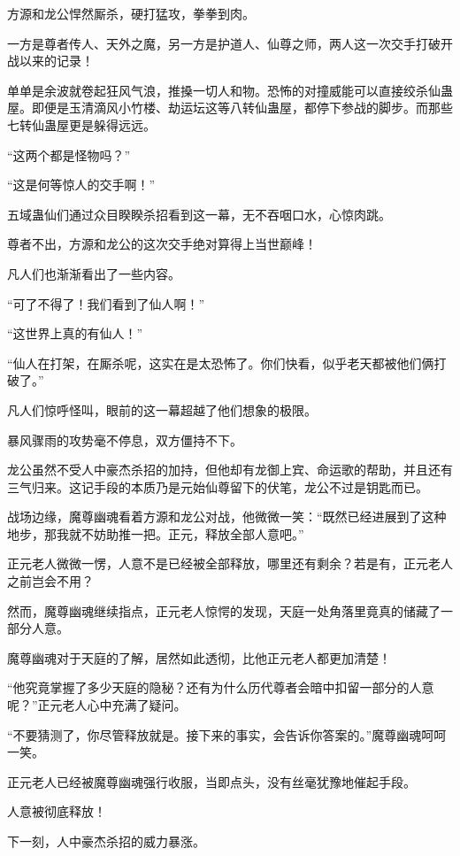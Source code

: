 \begin{this_body}
方源和龙公悍然厮杀，硬打猛攻，拳拳到肉。

一方是尊者传人、天外之魔，另一方是护道人、仙尊之师，两人这一次交手打破开战以来的记录！

单单是余波就卷起狂风气浪，推搡一切人和物。恐怖的对撞威能可以直接绞杀仙蛊屋。即便是玉清滴风小竹楼、劫运坛这等八转仙蛊屋，都停下参战的脚步。而那些七转仙蛊屋更是躲得远远。

“这两个都是怪物吗？”

“这是何等惊人的交手啊！”

五域蛊仙们通过众目睽睽杀招看到这一幕，无不吞咽口水，心惊肉跳。

尊者不出，方源和龙公的这次交手绝对算得上当世巅峰！

凡人们也渐渐看出了一些内容。

“可了不得了！我们看到了仙人啊！”

“这世界上真的有仙人！”

“仙人在打架，在厮杀呢，这实在是太恐怖了。你们快看，似乎老天都被他们俩打破了。”

凡人们惊呼怪叫，眼前的这一幕超越了他们想象的极限。

暴风骤雨的攻势毫不停息，双方僵持不下。

龙公虽然不受人中豪杰杀招的加持，但他却有龙御上宾、命运歌的帮助，并且还有三气归来。这记手段的本质乃是元始仙尊留下的伏笔，龙公不过是钥匙而已。

战场边缘，魔尊幽魂看着方源和龙公对战，他微微一笑：“既然已经进展到了这种地步，那我就不妨助推一把。正元，释放全部人意吧。”

正元老人微微一愣，人意不是已经被全部释放，哪里还有剩余？若是有，正元老人之前岂会不用？

然而，魔尊幽魂继续指点，正元老人惊愕的发现，天庭一处角落里竟真的储藏了一部分人意。

魔尊幽魂对于天庭的了解，居然如此透彻，比他正元老人都更加清楚！

“他究竟掌握了多少天庭的隐秘？还有为什么历代尊者会暗中扣留一部分的人意呢？”正元老人心中充满了疑问。

“不要猜测了，你尽管释放就是。接下来的事实，会告诉你答案的。”魔尊幽魂呵呵一笑。

正元老人已经被魔尊幽魂强行收服，当即点头，没有丝毫犹豫地催起手段。

人意被彻底释放！

下一刻，人中豪杰杀招的威力暴涨。

\end{this_body}

